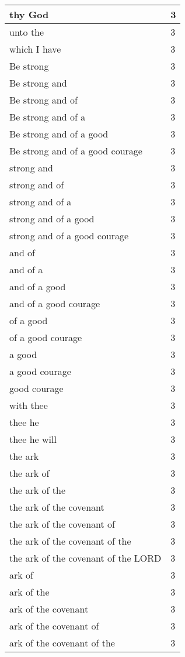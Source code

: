 \begin{center}
\begin{longtable}{|p{3.0in}|p{0.5in}|}
thy God & 3\\ \hline 
unto the & 3\\ \hline 
which I have & 3\\ \hline 
Be strong & 3\\ \hline 
Be strong and & 3\\ \hline 
Be strong and of & 3\\ \hline 
Be strong and of a & 3\\ \hline 
Be strong and of a good & 3\\ \hline 
Be strong and of a good courage & 3\\ \hline 
strong and & 3\\ \hline 
strong and of & 3\\ \hline 
strong and of a & 3\\ \hline 
strong and of a good & 3\\ \hline 
strong and of a good courage & 3\\ \hline 
and of & 3\\ \hline 
and of a & 3\\ \hline 
and of a good & 3\\ \hline 
and of a good courage & 3\\ \hline 
of a good & 3\\ \hline 
of a good courage & 3\\ \hline 
a good & 3\\ \hline 
a good courage & 3\\ \hline 
good courage & 3\\ \hline 
with thee & 3\\ \hline 
thee he & 3\\ \hline 
thee he will & 3\\ \hline 
the ark & 3\\ \hline 
the ark of & 3\\ \hline 
the ark of the & 3\\ \hline 
the ark of the covenant & 3\\ \hline 
the ark of the covenant of & 3\\ \hline 
the ark of the covenant of the & 3\\ \hline 
the ark of the covenant of the LORD & 3\\ \hline 
ark of & 3\\ \hline 
ark of the & 3\\ \hline 
ark of the covenant & 3\\ \hline 
ark of the covenant of & 3\\ \hline 
ark of the covenant of the & 3\\ \hline 

\end{longtable}
\end{center}
